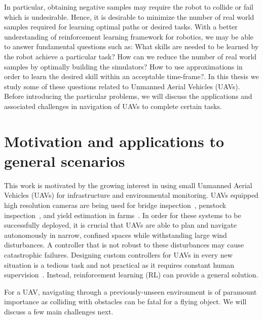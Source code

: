 \documentclass[12pt]{report}
\begin{document}
In particular, obtaining negative samples may require the robot to collide or fail which is undesirable. Hence, it is desirable to minimize the number of real world samples required for learning optimal paths or desired tasks. With a better understanding of reinforcement learning framework for robotics, we may be able to answer fundamental questions such as: What skills are needed to be learned by the robot achieve a particular task? How can we reduce the number of real world samples by optimally building the simulators? How to use approximations in order to learn the desired skill within an acceptable time-frame?. In this thesis we study some of these questions related to Unmanned Aerial Vehicles (UAVs). Before introducing the particular problems, we will discuss the applications and associated challenges in navigation of UAVs to complete certain tasks.

\section{Motivation and applications to general scenarios} 
This work is motivated by the growing interest in using small Unmanned Aerial Vehicles (UAVs) for infrastructure and environmental monitoring. UAVs equipped high resolution cameras are being used for bridge inspection~\cite{liu2014review}, penstock inspection~\cite{ozaslaninspection}, and yield estimation in farms~\cite{das2015devices}. In order for these systems to be successfully deployed, it is crucial that UAVs are able to plan and navigate autonomously in narrow, confined spaces while withstanding large wind disturbances. A controller that is not robust to these disturbances may cause catastrophic failures. Designing custom controllers for UAVs in every new situation is a tedious task and not practical as it requires constant human supervision~\cite{kober2012reinforcement}. Instead, reinforcement learning (RL) can provide a general solution.\par 
For a UAV, navigating through a previously-unseen environment is of paramount importance as colliding with obstacles can be fatal for a flying object. We will discuss a few main challenges next.
\end{document}
